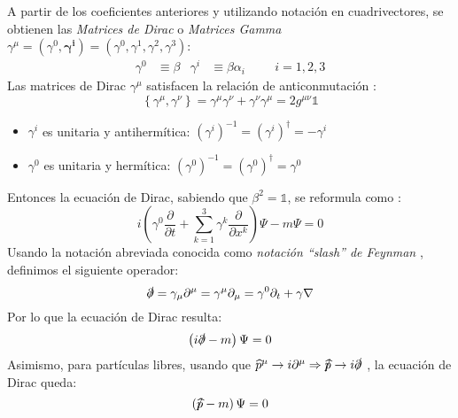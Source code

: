 A partir de los coeficientes anteriores y utilizando notación en cuadrivectores, se obtienen las \textit{Matrices de Dirac} o \textit{Matrices Gamma}  $\gamma^{\mu}=(\gamma^0, \boldsymbol{\gamma^{i}})=(\gamma^0, \gamma^1, \gamma^2, \gamma^3)$:
\begin{align}
\gamma ^0 &\equiv \beta & \gamma ^i &\equiv \beta \alpha_i \hspace{1cm} i=1, 2, 3 \label{eq:matricesDirac}
\end{align}
Las matrices de Dirac $\gamma^{\mu}$ satisfacen la relación de anticonmutación \cite{MCR}:
\begin{equation}
\left\{ \gamma ^{\mu },\gamma ^{\nu }\right\} =\gamma ^{\mu }\gamma ^{\nu }+\gamma ^{\nu }\gamma ^{\mu }=2g^{\mu \nu }\mathbb{1}\label{eq:anticomm_relation}
\end{equation}
\begin{itemize}
\item $\gamma^{i}$ es unitaria y antihermítica: $\left( \gamma ^{i}\right) ^{-1}=\left( \gamma ^{i}\right) ^{\dagger}=-\gamma ^{i}$
\item $\gamma^{0}$ es unitaria y hermítica: $\left( \gamma ^{0}\right) ^{-1}=\left( \gamma ^{0}\right) ^{\dagger}=\gamma ^{0}$
\end{itemize}

Entonces la ecuación de Dirac, sabiendo que $\beta^2=\mathbb{1}$, se reformula como \cite{MCR}:
\begin{equation}
i\left( \gamma ^{0}\dfrac{\partial }{\partial t}+\sum ^{3}_{k=1}\gamma ^{k}\dfrac{\partial }{\partial x^{k}}\right) \Psi -m\Psi =0\label{eq:ecDirac_cov}
\end{equation}
Usando la notación abreviada conocida como \textit{notación ``slash'' de Feynman} \cite{MCR}, definimos el siguiente operador:
\begin{equation}
\slashed{\partial}=\gamma_{\mu }\partial ^{\mu }=\gamma ^{\mu }\partial _{\mu }=\gamma ^{0}\partial _{t}+\gamma \nabla\label{eq:slashnot}
\end{equation}
Por lo que la ecuación de Dirac resulta:
\begin{equation}
\left(i \slashed{\partial}-m\right) \Psi =0\label{eq:Dirac_final}
\end{equation}
Asimismo, para partículas libres, usando que $\widehat{p}^{\mu} \rightarrow i\partial^{\mu} \Rightarrow \slashed{\widehat{p}} \rightarrow i\slashed{\partial}$ \cite{MCR}, la ecuación de Dirac queda:
\begin{equation}
\left( \slashed{\widehat{p}}-m\right) \Psi =0\label{eq:Dirac_free}
\end{equation}

